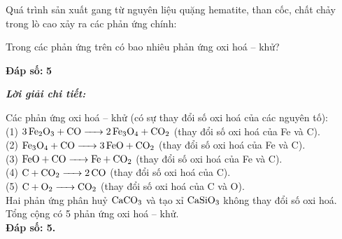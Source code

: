 \documentclass[11pt,a4paper]{article}
\def\loigiai#1{
\par\begingroup\color{blue!80!black}\small
\noindent\textbf{\textit{Lời giải chi tiết:}}\par
#1\par\endgroup}
\begin{document}
\begin{ex}
Quá trình sản xuất gang từ nguyên liệu quặng hematite, than cốc, chất chảy trong lò cao xảy ra các phản ứng chính:
\par{}\vspace{1pt}
Trong các phản ứng trên có bao nhiêu phản ứng oxi hoá -- khử?
\par\noindent\textbf{Đáp số:} \textbf{\color{red}5}
\loigiai{
Các phản ứng oxi hoá -- khử (có sự thay đổi số oxi hoá của các nguyên tố):\\
(1) $\ce{3Fe2O3 + CO -> 2Fe3O4 + CO2}$ (thay đổi số oxi hoá của Fe và C).\\
(2) $\ce{Fe3O4 + CO -> 3FeO + CO2}$ (thay đổi số oxi hoá của Fe và C).\\
(3) $\ce{FeO + CO -> Fe + CO2}$ (thay đổi số oxi hoá của Fe và C).\\
(4) $\ce{C + CO2 -> 2CO}$ (thay đổi số oxi hoá của C).\\
(5) $\ce{C + O2 -> CO2}$ (thay đổi số oxi hoá của C và O).\\
Hai phản ứng phân huỷ $\ce{CaCO3}$ và tạo xỉ $\ce{CaSiO3}$ không thay đổi số oxi hoá.\\
Tổng cộng có 5 phản ứng oxi hoá -- khử.\\
\textbf{Đáp số: 5.}}
\end{ex}
\end{document}
